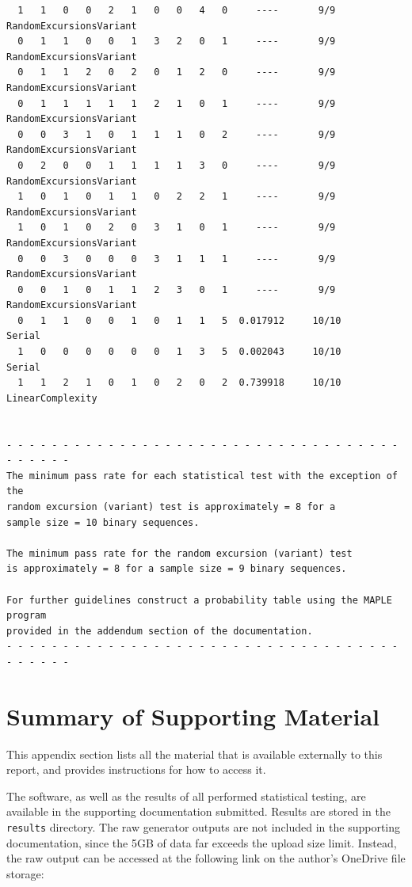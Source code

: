 \documentclass[12pt, titlepage]{report}
\theoremstyle{definition}
\begin{document}
\begin{verbatim}
  1   1   0   0   2   1   0   0   4   0     ----       9/9       RandomExcursionsVariant
  0   1   1   0   0   1   3   2   0   1     ----       9/9       RandomExcursionsVariant
  0   1   1   2   0   2   0   1   2   0     ----       9/9       RandomExcursionsVariant
  0   1   1   1   1   1   2   1   0   1     ----       9/9       RandomExcursionsVariant
  0   0   3   1   0   1   1   1   0   2     ----       9/9       RandomExcursionsVariant
  0   2   0   0   1   1   1   1   3   0     ----       9/9       RandomExcursionsVariant
  1   0   1   0   1   1   0   2   2   1     ----       9/9       RandomExcursionsVariant
  1   0   1   0   2   0   3   1   0   1     ----       9/9       RandomExcursionsVariant
  0   0   3   0   0   0   3   1   1   1     ----       9/9       RandomExcursionsVariant
  0   0   1   0   1   1   2   3   0   1     ----       9/9       RandomExcursionsVariant
  0   1   1   0   0   1   0   1   1   5  0.017912     10/10      Serial
  1   0   0   0   0   0   0   1   3   5  0.002043     10/10      Serial
  1   1   2   1   0   1   0   2   0   2  0.739918     10/10      LinearComplexity


- - - - - - - - - - - - - - - - - - - - - - - - - - - - - - - - - - - - - - - - -
The minimum pass rate for each statistical test with the exception of the
random excursion (variant) test is approximately = 8 for a
sample size = 10 binary sequences.

The minimum pass rate for the random excursion (variant) test
is approximately = 8 for a sample size = 9 binary sequences.

For further guidelines construct a probability table using the MAPLE program
provided in the addendum section of the documentation.
- - - - - - - - - - - - - - - - - - - - - - - - - - - - - - - - - - - - - - - - -
\end{verbatim}


\chapter{Summary of Supporting Material}
This appendix section lists all the material that is available externally to this report, and provides instructions for how to access it.

The software, as well as the results of all performed statistical testing, are available in the supporting documentation submitted. Results are stored in the \texttt{results} directory. The raw generator outputs are not included in the supporting documentation, since the 5GB of data far exceeds the upload size limit. Instead, the raw output can be accessed at the following link on the author's OneDrive file storage:
\end{document}
